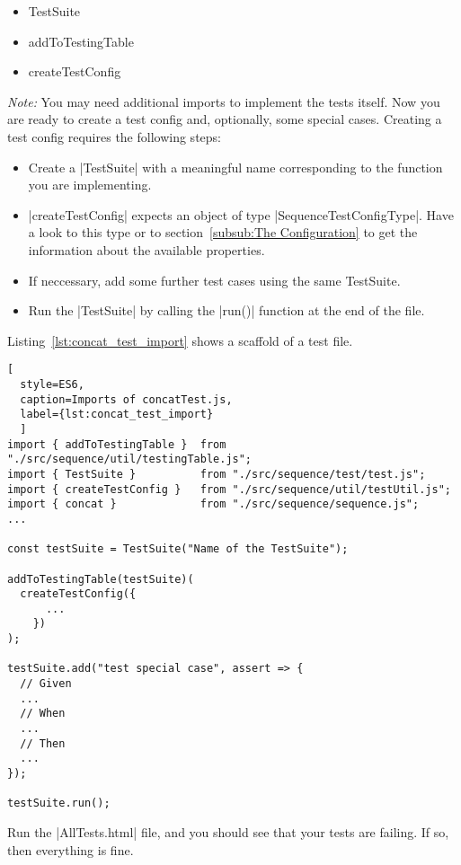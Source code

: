 \begin{itemize}
  \item{TestSuite}
  \item{addToTestingTable}
  \item{createTestConfig}
\end{itemize}

\textit{Note:} You may need additional imports to implement the tests itself.
\newline
Now you are ready to create a test config and, optionally, some special cases.
Creating a test config requires the following steps:

\begin{itemize}
  \item{Create a |TestSuite| with a meaningful name corresponding to the function you are implementing.}
  \item{|createTestConfig| expects an object of type |SequenceTestConfigType|. Have a look
    to this type or to section~\ref{subsub:The Configuration} to get the information about the available properties. }
      \item{If neccessary, add some further test cases using the same TestSuite.}
  \item{Run the |TestSuite| by calling the |run()| function at the end of the file. }
\end{itemize}

Listing~\ref{lst:concat_test_import} shows a scaffold of a test file. 

\begin{lstlisting}[
  style=ES6, 
  caption=Imports of concatTest.js,
  label={lst:concat_test_import}
  ]
import { addToTestingTable }  from "./src/sequence/util/testingTable.js";
import { TestSuite }          from "./src/sequence/test/test.js";
import { createTestConfig }   from "./src/sequence/util/testUtil.js";
import { concat }             from "./src/sequence/sequence.js";
...

const testSuite = TestSuite("Name of the TestSuite");

addToTestingTable(testSuite)(
  createTestConfig({
      ...
    })
);

testSuite.add("test special case", assert => {
  // Given
  ...
  // When
  ...
  // Then
  ...
});

testSuite.run();
\end{lstlisting}

Run the |AllTests.html| file, and you should see that your tests are failing.
If so, then everything is fine.

